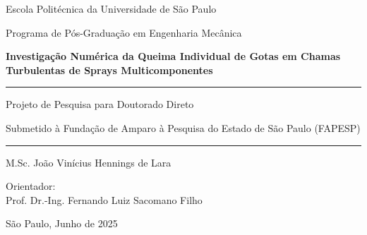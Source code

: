 \begin{titlepage}
    \centering
    \large
    {
    Escola Politécnica da Universidade de São Paulo \par
    Programa de Pós-Graduação em Engenharia Mecânica
    \par}

    \vspace*{6cm}
    
    {\bfseries\Large %
    Investigação Numérica da Queima Individual de Gotas em Chamas Turbulentas de Sprays Multicomponentes\par}

    \vspace{3cm}

    \hrule
    \vspace{0.4cm}
    {
    Projeto de Pesquisa para Doutorado Direto\par
    Submetido à Fundação de Amparo à Pesquisa do Estado de São Paulo (FAPESP)
    }    
    \vspace{0.4cm}
    \hrule
    
    \vspace{3cm}
    {
    M.Sc. João Vinícius Hennings de Lara\par
    }
    
    \vspace{1.5cm}
    {
    Orientador:\\ Prof. Dr.-Ing. Fernando Luiz Sacomano Filho
    }
    
    \vfill
    São Paulo, Junho de 2025

\end{titlepage}
